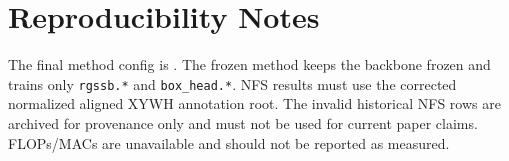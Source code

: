 \appendices
\section{Reproducibility Notes}

The final method config is \finalconfig{}. The frozen method keeps the backbone frozen and trains only \texttt{rgssb.*} and \texttt{box\_head.*}. NFS results must use the corrected normalized aligned XYWH annotation root. The invalid historical NFS rows are archived for provenance only and must not be used for current paper claims. FLOPs/MACs are unavailable and should not be reported as measured.
